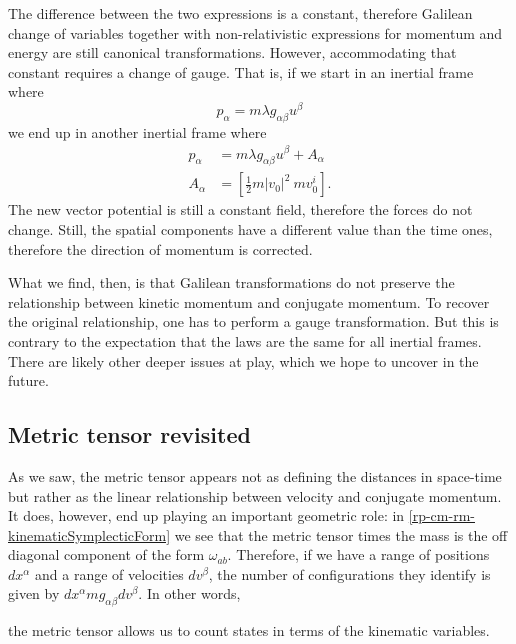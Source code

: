 The difference between the two expressions is a constant, therefore Galilean change of variables together with non-relativistic expressions for momentum and energy are still canonical transformations. However, accommodating that constant requires a change of gauge. That is, if we start in an inertial frame where
\begin{equation}
	p_{\alpha} = m \lambda g_{\alpha\beta} u^{\beta}
\end{equation}
we end up in another inertial frame where
\begin{equation}
	\begin{aligned}
	p_{\alpha} &= m \lambda g_{\alpha\beta} u^{\beta} + A_\alpha \\
	A_\alpha &= \left[\frac{1}{2} m|v_0|^2 \ mv_0^i\right].
	\end{aligned}
\end{equation}
The new vector potential is still a constant field, therefore the forces do not change. Still, the spatial components have a different value than the time ones, therefore the direction of momentum is corrected.

What we find, then, is that Galilean transformations do not preserve the relationship between kinetic momentum and conjugate momentum. To recover the original relationship, one has to perform a gauge transformation. But this is contrary to the expectation that the laws are the same for all inertial frames. There are likely other deeper issues at play, which we hope to uncover in the future.



\subsection{Metric tensor revisited}

As we saw, the metric tensor appears not as defining the distances in space-time but rather as the linear relationship between velocity and conjugate momentum. It does, however, end up playing an important geometric role: in \ref{rp-cm-rm-kinematicSymplecticForm} we see that the metric tensor times the mass is the off diagonal component of the form $\omega_{ab}$. Therefore, if we have a range of positions $dx^\alpha$ and a range of velocities $dv^\beta$, the number of configurations they identify is given by $dx^\alpha m g_{\alpha\beta} dv^\beta$. In other words,
\begin{insight}
	the metric tensor allows us to count states in terms of the kinematic variables.
\end{insight}

